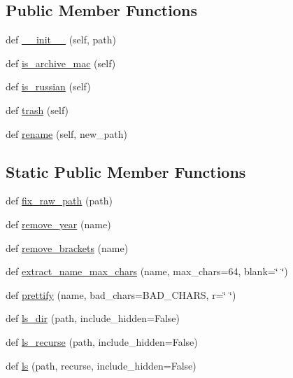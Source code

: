 \subsection*{Public Member Functions}
\begin{DoxyCompactItemize}
\item 
def \hyperlink{classhal_1_1files_1_1models_1_1_file_system_a17bf22e8739c0abe81a1736115ff6778}{\+\_\+\+\_\+init\+\_\+\+\_\+} (self, path)
\item 
def \hyperlink{classhal_1_1files_1_1models_1_1_file_system_a7b176e08ad6531bcc9caa04c44df1944}{is\+\_\+archive\+\_\+mac} (self)
\item 
def \hyperlink{classhal_1_1files_1_1models_1_1_file_system_a073400419be263c865c0971136d2898b}{is\+\_\+russian} (self)
\item 
def \hyperlink{classhal_1_1files_1_1models_1_1_file_system_a98912c19e86d13c67b0a9bb70682026c}{trash} (self)
\item 
def \hyperlink{classhal_1_1files_1_1models_1_1_file_system_a3388d434e8ae2be2f2b7b9a227ac418e}{rename} (self, new\+\_\+path)
\end{DoxyCompactItemize}
\subsection*{Static Public Member Functions}
\begin{DoxyCompactItemize}
\item 
def \hyperlink{classhal_1_1files_1_1models_1_1_file_system_a7fe20d282e84a1ad292f7e04de6d335d}{fix\+\_\+raw\+\_\+path} (path)
\item 
def \hyperlink{classhal_1_1files_1_1models_1_1_file_system_af473fc3f0450ffe57c2484fd76d3a40d}{remove\+\_\+year} (name)
\item 
def \hyperlink{classhal_1_1files_1_1models_1_1_file_system_ab97d14ce121829510e40c3f052c176df}{remove\+\_\+brackets} (name)
\item 
def \hyperlink{classhal_1_1files_1_1models_1_1_file_system_a809f1abc2282567f89f809a510e7d665}{extract\+\_\+name\+\_\+max\+\_\+chars} (name, max\+\_\+chars=64, blank=\char`\"{} \char`\"{})
\item 
def \hyperlink{classhal_1_1files_1_1models_1_1_file_system_a81206c773e9176fb2c0537a731381b7a}{prettify} (name, bad\+\_\+chars=B\+A\+D\+\_\+\+C\+H\+A\+RS, r=\char`\"{} \char`\"{})
\item 
def \hyperlink{classhal_1_1files_1_1models_1_1_file_system_a60f66aeec22d00b67067f3527d06db74}{ls\+\_\+dir} (path, include\+\_\+hidden=False)
\item 
def \hyperlink{classhal_1_1files_1_1models_1_1_file_system_a2df7cb545b239ccb239b71f808ce5808}{ls\+\_\+recurse} (path, include\+\_\+hidden=False)
\item 
def \hyperlink{classhal_1_1files_1_1models_1_1_file_system_aaf2fadb1bb388e4b565da0db6823f4f5}{ls} (path, recurse, include\+\_\+hidden=False)
\end{DoxyCompactItemize}
